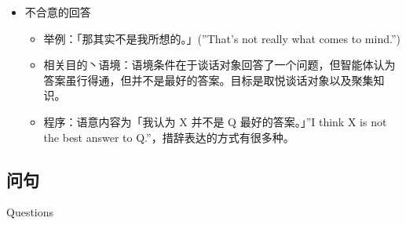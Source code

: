 \begin{itemize}
\item 不合意的回答
\begin{itemize}
\item 举例：「那其实不是我所想的。」(”That’s not really what comes to mind.”) 
\item 相关目的丶语境：语境条件在于谈话对象回答了一个问题，但智能体认为答案虽行得通，但并不是最好的答案。目标是取悦谈话对象以及聚集知识。
\item 程序：语意内容为「我认为 X 并不是 Q 最好的答案。」”I think X is not the best answer to Q.”，措辞表达的方式有很多种。
\end{itemize}


\end{itemize}

\subsection{问句}{Questions}

